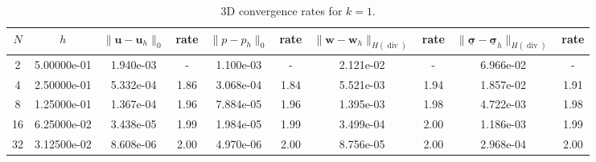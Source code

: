 \begin{table}[ht!]
\centering
\renewcommand{\arraystretch}{1.15}
\begin{tabular}{cccccccccc}
\toprule
$N$ & $h$ & $\|\mathbf{u}-\mathbf{u}_h\|_{0}$ & rate & $\|p-p_h\|_{0}$ & rate & $\|\mathbf{w}-\mathbf{w}_h\|_{H(\operatorname{div})}$ & rate & $\|\underline{\boldsymbol{\sigma}}-\underline{\boldsymbol{\sigma}}_h\|_{H(\operatorname{div})}$ & rate \\
\midrule
2 & 5.00000e-01 & 1.940e-03 & - & 1.100e-03 & - & 2.121e-02 & - & 6.966e-02 & - \\
4 & 2.50000e-01 & 5.332e-04 & 1.86 & 3.068e-04 & 1.84 & 5.521e-03 & 1.94 & 1.857e-02 & 1.91 \\
8 & 1.25000e-01 & 1.367e-04 & 1.96 & 7.884e-05 & 1.96 & 1.395e-03 & 1.98 & 4.722e-03 & 1.98 \\
16 & 6.25000e-02 & 3.438e-05 & 1.99 & 1.984e-05 & 1.99 & 3.499e-04 & 2.00 & 1.186e-03 & 1.99 \\
32 & 3.12500e-02 & 8.608e-06 & 2.00 & 4.970e-06 & 2.00 & 8.756e-05 & 2.00 & 2.968e-04 & 2.00 \\
\bottomrule
\end{tabular}
\caption{3D convergence rates for $k=1$.}
\label{tab:biot_convergence_3d_k1}
\end{table}